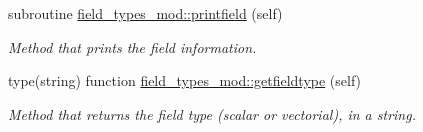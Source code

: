 \begin{DoxyCompactItemize}
subroutine \mbox{\hyperlink{namespacefield__types__mod_aaf5716bf674e6caa4d8a9f3a14a5b393}{field\+\_\+types\+\_\+mod\+::printfield}} (self)
\begin{DoxyCompactList}\small\item\em Method that prints the field information. \end{DoxyCompactList}\item 
type(string) function \mbox{\hyperlink{namespacefield__types__mod_aef22f053fd727cf82be4386d65b47031}{field\+\_\+types\+\_\+mod\+::getfieldtype}} (self)
\begin{DoxyCompactList}\small\item\em Method that returns the field type (scalar or vectorial), in a string. \end{DoxyCompactList}\end{DoxyCompactItemize}
